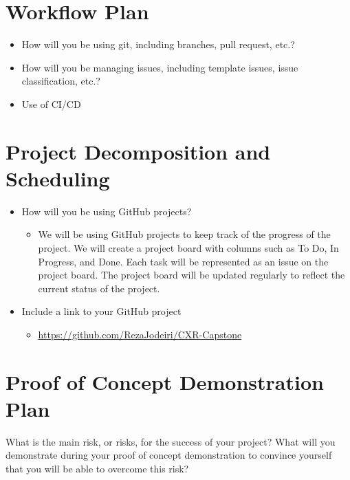 \documentclass{article}
\begin{document}
\section{Workflow Plan}

\begin{itemize}
	\item How will you be using git, including branches, pull request, etc.?
	\item How will you be managing issues, including template issues, issue
	classification, etc.?
  \item Use of CI/CD
\end{itemize}

\section{Project Decomposition and Scheduling}


\begin{itemize}
    \item How will you be using GitHub projects? 
    
    \begin{itemize}
        \item We will be using GitHub projects to keep track of the progress of the project. We will create a project board with columns such as To Do, In Progress, and Done. Each task will be represented as an issue on the project board. The project board will be updated regularly to reflect the current status of the project.
    \end{itemize}
    \item Include a link to your GitHub project 
    \begin{itemize}
        \item \url{https://github.com/RezaJodeiri/CXR-Capstone}
    \end{itemize}
\end{itemize}



\section{Proof of Concept Demonstration Plan}

What is the main risk, or risks, for the success of your project?  What will you
demonstrate during your proof of concept demonstration to convince yourself that
you will be able to overcome this risk?
\end{document}
